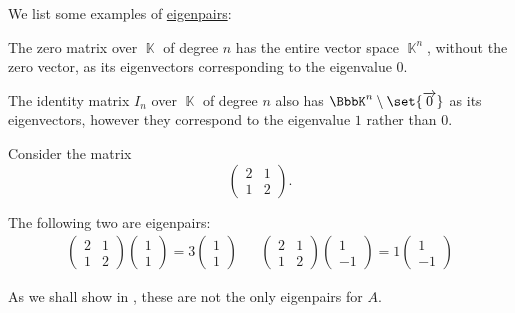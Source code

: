 \begin{example}\label{ex:def:eigenpair}
  We list some examples of \hyperref[def:eigenpair]{eigenpairs}:
  \begin{thmenum}
     The zero matrix over \( \BbbK \) of degree \( n \) has the entire vector space \( \BbbK^n \), without the zero vector, as its eigenvectors corresponding to the eigenvalue \( 0 \).

     The identity matrix \( I_n \) over \( \BbbK \) of degree \( n \) also has \( \BbbK^n \setminus \set{ \vect 0 } \) as its eigenvectors, however they correspond to the eigenvalue \( 1 \) rather than \( 0 \).

     Consider the matrix
    \begin{equation*}
      \begin{pmatrix}
        2 & 1 \\
        1 & 2
      \end{pmatrix}.
    \end{equation*}

    The following two are eigenpairs:
    \begin{align*}
      \begin{pmatrix}
        2 & 1 \\
        1 & 2
      \end{pmatrix}
      \begin{pmatrix}
        1 \\ 1
      \end{pmatrix}
      =
      3
      \begin{pmatrix}
        1 \\ 1
      \end{pmatrix}
      &&
      \begin{pmatrix}
        2 & 1 \\
        1 & 2
      \end{pmatrix}
      \begin{pmatrix}
        1 \\ -1
      \end{pmatrix}
      =
      1
      \begin{pmatrix}
        1 \\ -1
      \end{pmatrix}
    \end{align*}

    As we shall show in , these are not the only eigenpairs for \( A \).


\end{thmenum}
\end{example}
